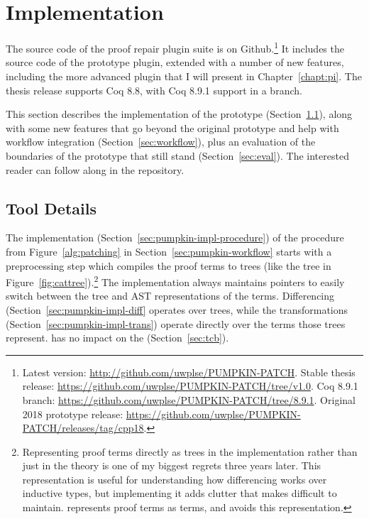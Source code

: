\section{Implementation}
\label{sec:pumpkin-impl}


The source code of the  proof repair plugin suite is on Github.\footnote{Latest version: \url{http://github.com/uwplse/PUMPKIN-PATCH}. Stable thesis release: \url{https://github.com/uwplse/PUMPKIN-PATCH/tree/v1.0}. Coq 8.9.1 branch: \url{https://github.com/uwplse/PUMPKIN-PATCH/tree/8.9.1}. Original 2018 prototype release: \url{https://github.com/uwplse/PUMPKIN-PATCH/releases/tag/cpp18}.}
It includes the source code of the  prototype plugin, extended with a number of new features,
including the more advanced \toolnamec plugin that I will present in Chapter~\ref{chapt:pi}.
The thesis release supports Coq 8.8, with Coq 8.9.1 support in a branch.

This section describes the implementation of the \sysname prototype (Section~\ref{sec:tool}),
along with some new features that go beyond the original prototype and help with workflow integration (Section~\ref{sec:workflow}),
plus an evaluation of the boundaries of the \sysname prototype that still stand (Section~\ref{sec:eval}).
The interested reader can follow along in the repository.


\subsection{Tool Details}
\label{sec:tool}


The implementation (Section~\ref{sec:pumpkin-impl-procedure}) of the procedure from Figure~\ref{alg:patching} in Section~\ref{sec:pumpkin-workflow}
starts with a preprocessing step which compiles the proof terms to 
trees (like the tree in Figure~\ref{fig:cattree}).\footnote{Representing proof terms directly as trees in the implementation rather
than just in the theory is one of my biggest regrets three years later.
This representation is useful for understanding how differencing works over inductive types, but implementing it adds clutter that makes \sysname difficult to maintain.
\toolnamec represents proof terms as terms, and avoids this representation.}
The implementation always maintains pointers to easily switch between the tree and AST representations of the terms.
Differencing (Section~\ref{sec:pumpkin-impl-diff} operates over trees, 
while the transformations (Section~\ref{sec:pumpkin-impl-trans}) operate directly over the terms those trees represent.
\sysname has no impact on the  (Section~\ref{sec:tcb}).

